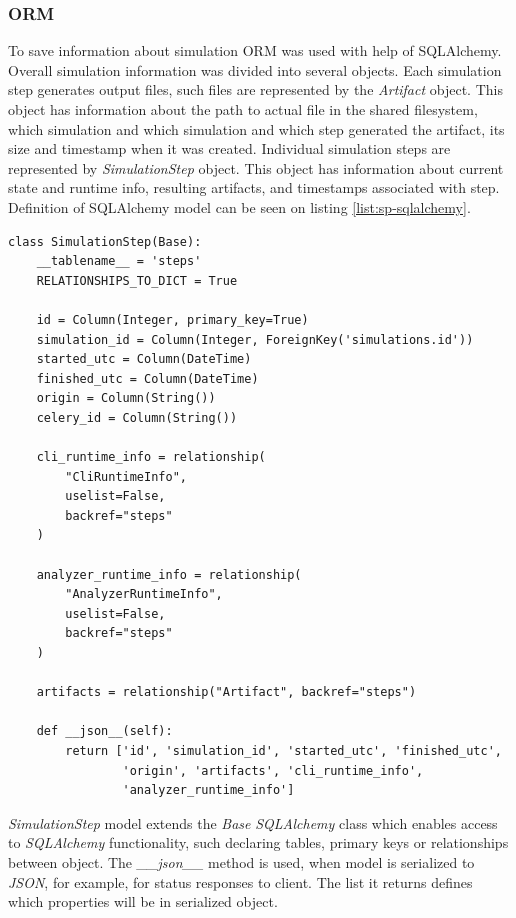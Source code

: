 \subsubsection{ORM}
To save information about simulation ORM was used with help of SQLAlchemy. Overall simulation information was divided into several objects. Each simulation step generates output files, such files are represented by the \textit{Artifact} object. This object has information about the path to actual file in the shared filesystem, which simulation and which simulation and which step generated the artifact, its size and timestamp when it was created. Individual simulation steps are represented by \textit{SimulationStep} object. This object has information about current state and runtime info, resulting artifacts, and timestamps associated with step. Definition of SQLAlchemy model can be seen on listing \ref{list:sp-sqlalchemy}.
\begin{lstlisting}[label=list:sp-sqlalchemy,caption=SimulationStep SQLAlchemy model, basicstyle=\footnotesize\ttfamily]
class SimulationStep(Base):
    __tablename__ = 'steps'
    RELATIONSHIPS_TO_DICT = True

    id = Column(Integer, primary_key=True)
    simulation_id = Column(Integer, ForeignKey('simulations.id'))
    started_utc = Column(DateTime)
    finished_utc = Column(DateTime)
    origin = Column(String())
    celery_id = Column(String())
  
    cli_runtime_info = relationship(
        "CliRuntimeInfo", 
        uselist=False, 
        backref="steps"
    )
  
    analyzer_runtime_info = relationship(
        "AnalyzerRuntimeInfo", 
        uselist=False,
        backref="steps"
    )
  
    artifacts = relationship("Artifact", backref="steps")
    
    def __json__(self):
        return ['id', 'simulation_id', 'started_utc', 'finished_utc',
                'origin', 'artifacts', 'cli_runtime_info',
                'analyzer_runtime_info']
\end{lstlisting}
\textit{SimulationStep} model extends the \textit{Base} \textit{SQLAlchemy} class which enables access to \textit{SQLAlchemy} functionality, such declaring tables, primary keys or relationships between object. The \textit{\_\_json\_\_} method is used, when model is serialized to \textit{JSON}, for example, for status responses to client. The list it returns defines which properties will be in serialized object. 
